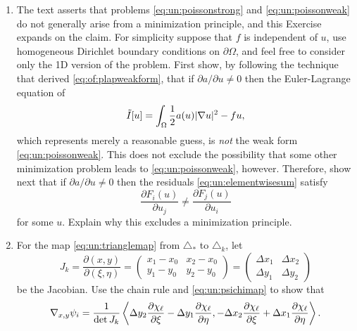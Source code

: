 \renewcommand{\labelenumi}{\arabic{chapter}.\arabic{enumi}\quad}
\renewcommand{\labelenumii}{(\alph{enumii})}
\begin{enumerate}
\item \label{exer:un:notminimization}  The text asserts that problems \eqref{eq:un:poissonstrong} and \eqref{eq:un:poissonweak} do not generally arise from a minimization principle, and this Exercise expands on the claim.  For simplicity suppose that $f$ is independent of $u$, use homogeneous Dirichlet boundary conditions on $\partial \Omega$, and feel free to consider only the 1D version of the problem.  First show, by following the technique that derived \eqref{eq:of:plapweakform}, that if $\partial a/\partial u \ne 0$ then the Euler-Lagrange equation of
\begin{equation}
  \tilde I[u] = \int_\Omega \frac{1}{2} a(u) |\nabla u|^2 - f u,  \label{eq:un:nottheobjective}
\end{equation}
which represents merely a reasonable guess, is \emph{not} the weak form \eqref{eq:un:poissonweak}.  This does not exclude the possibility that some other minimization problem leads to \eqref{eq:un:poissonweak}, however.  Therefore, show next that if $\partial a/\partial u \ne 0$ then the residuals \eqref{eq:un:elementwisesum} satisfy
\begin{equation}
  \frac{\partial F_i(u)}{\partial u_j} \ne \frac{\partial F_j(u)}{\partial u_i} \label{eq:un:symmetryresidualsdonthave}
\end{equation}
for some $u$.  Explain why this excludes a minimization principle.
\item  \label{exer:un:gradientdetails}  For the map \eqref{eq:un:trianglemap} from $\triangle_\ast$ to $\triangle_k$, let
    $$J_k = \frac{\partial (x,y)}{\partial (\xi,\eta)} = \begin{pmatrix}
    x_1 - x_0 & x_2 - x_0 \\
    y_1 - y_0 & y_2 - y_0 \end{pmatrix}
    = \begin{pmatrix}
    \Delta x_1 & \Delta x_2 \\
    \Delta y_1 & \Delta y_2
    \end{pmatrix}$$
be the Jacobian.  Use the chain rule and \eqref{eq:un:psichimap} to show that
\begin{equation}
\grad_{x,y} \psi_i = \frac{1}{\det J_k} \left<\Delta y_2 \frac{\partial \chi_\ell}{\partial \xi} - \Delta y_1 \frac{\partial \chi_\ell}{\partial \eta}, - \Delta x_2 \frac{\partial \chi_\ell}{\partial \xi} + \Delta x_1 \frac{\partial \chi_\ell}{\partial \eta}\right>. \label{eq:un:gradpsionref}

\end{equation}
\end{enumerate}
